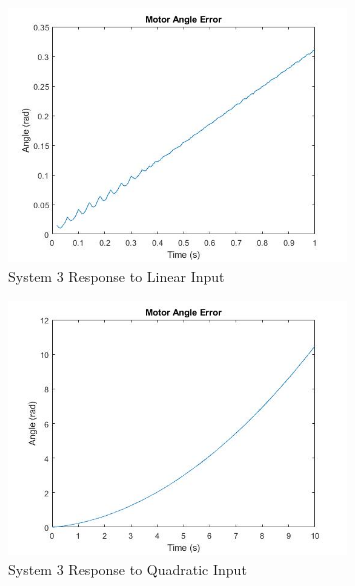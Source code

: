 \begin{figure}[H]
        \centering
        \includegraphics[width=0.8\textwidth]{./figures/lab4_fig14-part4-3-3-error-rc-D=1-linear.jpg}
        \caption{System 3 Response to Linear Input}
        \label{fig:system3_linear}
\end{figure}

\begin{figure}[H]
        \centering
        \includegraphics[width=0.8\textwidth]{./figures/lab4_fig15-part4-3-3-error-rc-D=1-quadratic.jpg}
        \caption{System 3 Response to Quadratic Input}
        \label{fig:system3_quadratic}
\end{figure}
